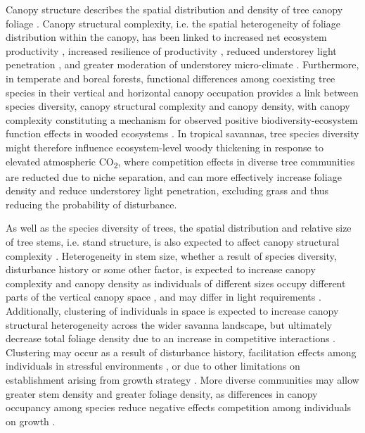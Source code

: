 \documentclass[11pt,a4paper]{article}
\begin{document}
Canopy structure describes the spatial distribution and density of tree canopy foliage \citep{Lowman2004}. Canopy structural complexity, i.e. the spatial heterogeneity of foliage distribution within the canopy, has been linked to increased net ecosystem productivity \citep{Gough2019, Hardiman2011, Chen2012, Law2001, Baldocchi2001, Morin2015}, increased resilience of productivity \citep{Pretzsch2014}, reduced understorey light penetration \citep{Scheuermann2018, Fotis2018}, and greater moderation of understorey micro-climate \citep{Wright2017}. Furthermore, in temperate and boreal forests, functional differences among coexisting tree species in their vertical and horizontal canopy occupation provides a link between species diversity, canopy structural complexity and canopy density, with canopy complexity constituting a mechanism for observed positive biodiversity-ecosystem function effects in wooded ecosystems \citep{Pretzsch2014, Barry2019}. In tropical savannas, tree species diversity might therefore influence ecosystem-level woody thickening in response to elevated atmospheric CO\textsubscript{2}, where competition effects in diverse tree communities are reducted due to niche separation, and can more effectively increase foliage density and reduce understorey light penetration, excluding grass and thus reducing the probability of disturbance. 

As well as the species diversity of trees, the spatial distribution and relative size of tree stems, i.e. stand structure, is also expected to affect canopy structural complexity \citep{Stark2015}. Heterogeneity in stem size, whether a result of species diversity, disturbance history or some other factor, is expected to increase canopy complexity and canopy density as individuals of different sizes occupy different parts of the vertical canopy space \citep{Panzou2020}, and may differ in light requirements \citep{CharlesDominique2018}. Additionally, clustering of individuals in space is expected to increase canopy structural heterogeneity across the wider savanna landscape, but ultimately decrease total foliage density due to an increase in competitive interactions \citep{Dohn2017}. Clustering may occur as a result of disturbance history, facilitation effects among individuals in stressful environments \citep{Ratcliffe2017}, or due to other limitations on establishment arising from growth strategy \citep{}. More diverse communities may allow greater stem density and greater foliage density, as differences in canopy occupancy among species reduce negative effects competition among individuals on growth \citep{Gough2019}.
\end{document}
